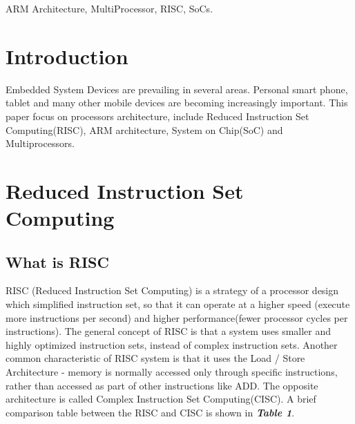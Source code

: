 \documentclass[conference]{IEEEtran}
\begin{document}
\begin{IEEEkeywords}
ARM Architecture, MultiProcessor, RISC, SoCs.
\end{IEEEkeywords}




%
\IEEEpeerreviewmaketitle



\section{Introduction}
Embedded System Devices are prevailing in several areas. Personal smart phone, tablet and many other mobile devices are becoming increasingly important. This paper focus on processors architecture, include Reduced Instruction Set Computing(RISC), ARM architecture, System on Chip(SoC) and Multiprocessors.
\section{Reduced Instruction Set Computing}
\subsection{What is RISC}
RISC (Reduced Instruction Set Computing) is a strategy of a processor design which simplified instruction set, so that it can operate at a higher speed (execute more instructions per second) and higher performance(fewer processor cycles per instructions). The general concept of RISC is that a system uses smaller and highly optimized instruction sets, instead of complex instruction sets. Another common characteristic of RISC system is that it uses the Load / Store Architecture - memory is normally accessed only through specific instructions, rather than accessed as part of other instructions like ADD.\cite{A} The opposite architecture is called Complex Instruction Set Computing(CISC). A brief comparison table between the RISC and CISC is shown in \textit{\textbf{Table 1}}.\\
\end{document}
